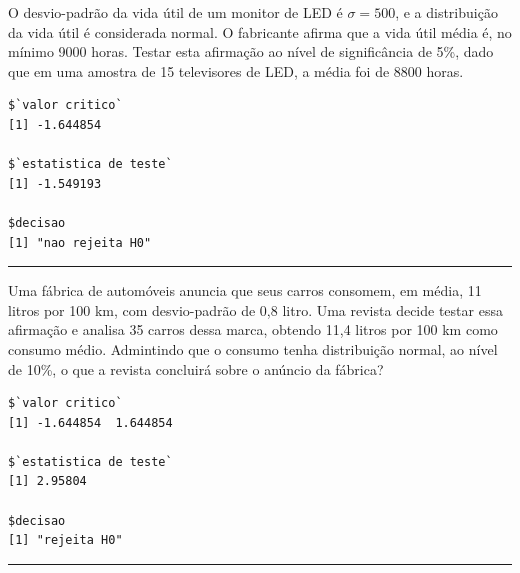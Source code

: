 \documentclass[a4paper,11pt,fleqn]{article}\usepackage[]{graphicx}\usepackage[]{color}
\makeatletter
\newenvironment{kframe}{%
 \def\at@end@of@kframe{}%
 \ifinner\ifhmode%
  \def\at@end@of@kframe{\end{minipage}}%
  \begin{minipage}{\columnwidth}%
 \fi\fi%
 \def\FrameCommand##1{\hskip\@totalleftmargin \hskip-\fboxsep
 \colorbox{shadecolor}{##1}\hskip-\fboxsep
     \hskip-\linewidth \hskip-\@totalleftmargin \hskip\columnwidth}%
 \MakeFramed {\advance\hsize-\width
   \@totalleftmargin\z@ \linewidth\hsize
   \@setminipage}}%
 {\par\unskip\endMakeFramed%
 \at@end@of@kframe}
\newenvironment{knitrout}{}{} %
\theoremstyle{definition}
\makeatother
\begin{document}
\begin{compactenum}[15.] %
\item O desvio-padrão da vida útil de um monitor de LED é $\sigma =
  500$, e a distribuição da vida útil é considerada normal. O fabricante
  afirma que a vida útil média é, no mínimo 9000 horas. Testar esta
  afirmação ao nível de significância de 5\%, dado que em uma amostra de
  15 televisores de LED, a média foi de 8800 horas.
\begin{knitrout}\small
{}\color{fgcolor}\begin{kframe}
\begin{verbatim}
$`valor critico`
[1] -1.644854

$`estatistica de teste`
[1] -1.549193

$decisao
[1] "nao rejeita H0"
\end{verbatim}
\end{kframe}
\end{knitrout}
\end{compactenum}

\vspace{0.3cm}
\hrule
\vspace{0.3cm}

\begin{compactenum}[16.] %
\item Uma fábrica de automóveis anuncia que seus carros consomem, em
  média, 11 litros por 100 km, com desvio-padrão de 0,8 litro. Uma
  revista decide testar essa afirmação e analisa 35 carros dessa marca,
  obtendo 11,4 litros por 100 km como consumo médio. Admintindo que o
  consumo tenha distribuição normal, ao nível de 10\%, o que a revista
  concluirá sobre o anúncio da fábrica?
\begin{knitrout}\small
{}\color{fgcolor}\begin{kframe}
\begin{verbatim}
$`valor critico`
[1] -1.644854  1.644854

$`estatistica de teste`
[1] 2.95804

$decisao
[1] "rejeita H0"
\end{verbatim}
\end{kframe}
\end{knitrout}
\end{compactenum}

\vspace{0.3cm}
\hrule
\vspace{0.3cm}
\end{document}
